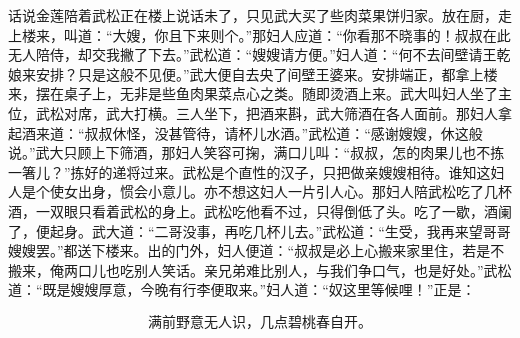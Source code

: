 话说金莲陪着武松正在楼上说话未了，只见武大买了些肉菜果饼归家。放在厨，走上楼来，叫道：“大嫂，你且下来则个。”那妇人应道：“你看那不晓事的！叔叔在此无人陪侍，却交我撇了下去。”武松道：“嫂嫂请方便。”妇人道：“何不去间壁请王乾娘来安排？只是这般不见便。”武大便自去央了间壁王婆来。安排端正，都拿上楼来，摆在桌子上，无非是些鱼肉果菜点心之类。随即烫酒上来。武大叫妇人坐了主位，武松对席，武大打横。三人坐下，把酒来斟，武大筛酒在各人面前。那妇人拿起酒来道：“叔叔休怪，没甚管待，请杯儿水酒。”武松道：“感谢嫂嫂，休这般说。”武大只顾上下筛酒，那妇人笑容可掬，满口儿叫：“叔叔，怎的肉果儿也不拣一箸儿？”拣好的递将过来。武松是个直性的汉子，只把做亲嫂嫂相待。谁知这妇人是个使女出身，惯会小意儿。亦不想这妇人一片引人心。那妇人陪武松吃了几杯酒，一双眼只看着武松的身上。武松吃他看不过，只得倒低了头。吃了一歇，酒阑了，便起身。武大道：“二哥没事，再吃几杯儿去。”武松道：“生受，我再来望哥哥嫂嫂罢。”都送下楼来。出的门外，妇人便道：“叔叔是必上心搬来家里住，若是不搬来，俺两口儿也吃别人笑话。亲兄弟难比别人，与我们争口气，也是好处。”武松道：“既是嫂嫂厚意，今晚有行李便取来。”妇人道：“奴这里等候哩！”正是：

\[
满前野意无人识，几点碧桃春自开。
\]

